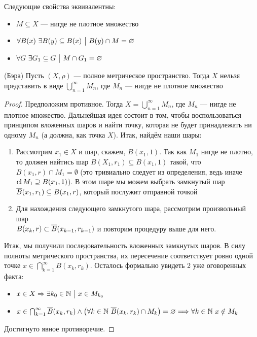 \begin{proposition}
	Следующие свойства эквивалентны:
	\begin{itemize}
		\item $M \subseteq X$ --- нигде не плотное множество
		
		\item $\forall B(x)\ \exists B(y) \subseteq B(x) \ \big|\  B(y) \cap M = \varnothing$
		
		\item $\forall G\ \exists G_1 \subseteq G \ \big|\  M \cap G_1 = \varnothing$
	\end{itemize}
\end{proposition}

\begin{theorem} (Бэра)
	Пусть $(X, \rho)$ --- полное метрическое пространство. Тогда $X$ нельзя представить в виде $\bigcup_{n = 1}^\infty M_n$, где $M_n$ --- нигде не плотное множество
\end{theorem}

\begin{proof}
	Предположим противное. Тогда $X = \bigcup_{n = 1}^\infty M_n$, где $M_n$ --- нигде не плотное множество. Дальнейшая идея состоит в том, чтобы воспользоваться принципом вложенных шаров и найти точку, которая не будет принадлежать ни одному $M_n$ (а должна, как точка $X$). Итак, найдём наши шары:
	\begin{enumerate}
		\item Рассмотрим $x_1 \in X$ и шар, скажем, $B(x_1, 1)$. Так как $M_1$ нигде не плотно, то должен найтись шар $B(X_1, r_1) \subseteq B(x_1, 1)$ такой, что $B(x_1, r) \cap M_1 = \emptyset$ (это тривиально следует из определения, ведь иначе $\operatorname{cl} M_1 \supseteq B(x_1, 1)$). В этом шаре мы можем выбрать замкнутый шар $\overline{B}(x_1, r_1) \subseteq B(x_1, r)$, который послужит отправной точкой
		
		\item Для нахождения следующего замкнутого шара, рассмотрим произвольный шар \\ $B(x_k, r) \subset \overline{B}(x_{k - 1}, r_{k - 1})$ и повторим процедуру выше для него.
	\end{enumerate}
	Итак, мы получили последовательность вложенных замкнутых шаров. В силу полноты метрического пространства, их пересечение соответствует ровно одной точке $x \in \bigcap_{k = 1}^\infty B(x_k, r_k)$. Осталось формально увидеть 2 уже оговоренных факта:
	\begin{itemize}
		\item $x \in X \Rightarrow \exists k_0 \in \mathbb{N} \ \big|\  x \in M_{k_0}$
		
		\item $x \in \bigcap_{k = 1}^\infty \overline{B}(x_k, r_k) \wedge \big(\forall k \in \mathbb{N}\ \overline{B}(x_k, r_k) \cap M_k\big) = \varnothing \Longrightarrow \forall k \in \mathbb{N}\ x \notin M_k$
	\end{itemize}
	Достигнуто явное противоречие.
\end{proof}

